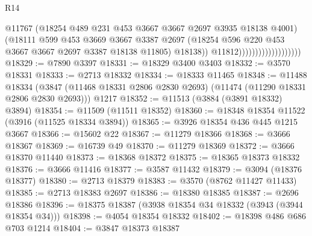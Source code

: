 \begin{lexlean}{R14}
\begin{coremodule}
                                            @11767
                                            (@18254
                                              @489
                                              @231
                                              @453
                                              @3667
                                              @3667
                                              @2697
                                              @3935
                                              @18138
                                              @4001)
                                            (@18111
                                              @599
                                              @453
                                              @3669
                                              @3667
                                              @3387
                                              @2697
                                              (@18254
                                                @596
                                                @220
                                                @453
                                                @3667
                                                @3667
                                                @2697
                                                @3387
                                                @18138
                                                @11805)
                                              @18138))
                                          @11812)))))))))))))))))))
@18329 := @7890 @3397
@18331 := @18329 @3400 @3403
@18332 := @3570 @18331
@18333 := @2713 @18332
@18334 := @18333 @11465
@18348 := @11488
    @18334
    (@3847 (@11468 @18331 @2806 @2830 @2693) (@11474 (@11290 @18331 @2806 @2830 @2693)))
    @1217
@18352 := @11513 (@3884 (@3891 @18332) @3894)
@18354 := @11509 (@11511 @18352)
@18360 := @18348 @18354 @11522 (@3916 (@11525 @18334 @3894))
@18365 := @3926 @18354 @436 @445 @1215 @3667
@18366 := @15602 @22
@18367 := @11279 @18366
@18368 := @3666 @18367
@18369 := @16739 @49
@18370 := @11279 @18369
@18372 := @3666 @18370 @11440
@18373 := @18368 @18372
@18375 := @18365 @18373 @18332
@18376 := @3666 @11416
@18377 := @3587 @11432
@18379 := @3094 (@18376 @18377)
@18380 := @2713 @18379
@18383 := @3570 (@8762 @11427 @11433)
@18385 := @2713 @18383 @2697
@18386 := @18380 @18385
@18387 := @2696 @18386
@18396 := @18375 @18387 (@3938 @18354 @34 @18332 (@3943 (@3944 @18354 @34)))
@18398 := @4054 @18354 @18332
@18402 := @18398 @486 @686 @703 @1214
@18404 := @3847 @18373 @18387

\end{coremodule}
\end{lexlean}

